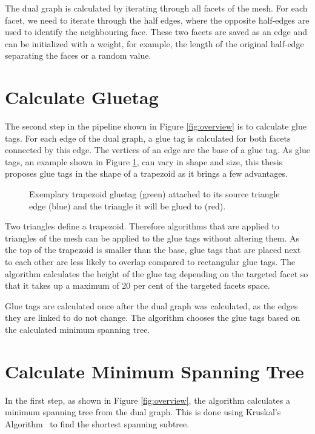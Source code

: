 \documentclass[draft,final]{vutinfth} %
\begin{document}
The dual graph is calculated by iterating through all facets of the mesh. For each facet, we need to iterate through the half edges, where the opposite half-edges are used to identify the neighbouring face. These two facets are saved as an edge and can be initialized with a weight, for example, the length of the original half-edge separating the faces or a random value.

\section{Calculate Gluetag}

The second step in the pipeline shown in Figure \ref{fig:overview} is to calculate glue tags. For each edge of the dual graph, a glue tag is calculated for both facets connected by this edge. The vertices of an edge are the base of a glue tag. As glue tags, an example shown in Figure \ref{fig:gluetag}, can vary in shape and size, this thesis proposes glue tags in the shape of a trapezoid as it brings a few advantages. 

\begin{figure}

\caption{Exemplary trapezoid gluetag (green) attached to its source triangle edge (blue) and the triangle it will be glued to (red).}
\label{fig:gluetag}
\end{figure}

Two triangles define a trapezoid. Therefore algorithms that are applied to triangles of the mesh can be applied to the glue tags without altering them. As the top of the trapezoid is smaller than the base, glue tags that are placed next to each other are less likely to overlap compared to rectangular glue tags. The algorithm calculates the height of the glue tag depending on the targeted facet so that it takes up a maximum of 20 per cent of the targeted facets space.

Glue tags are calculated once after the dual graph was calculated, as the edges they are linked to do not change. The algorithm chooses the glue tags based on the calculated minimum spanning tree.

\section{Calculate Minimum Spanning Tree}

In the first step, as shown in Figure \ref{fig:overview}, the algorithm calculates a minimum spanning tree from the dual graph. This is done using Kruskal's Algorithm~\cite{kruskal1956shortest} to find the shortest spanning subtree.
\end{document}
